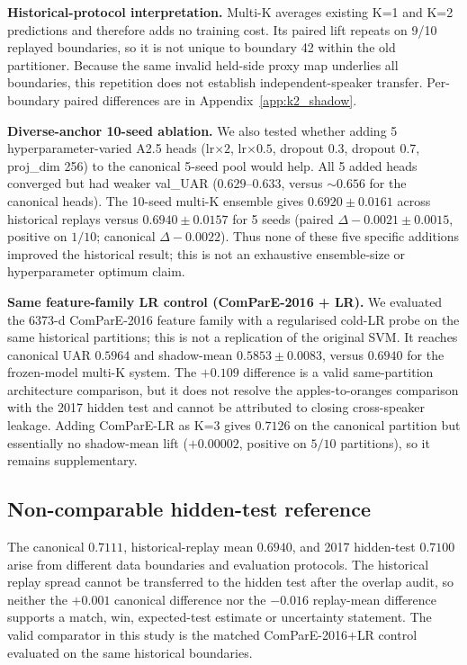 \textbf{Historical-protocol interpretation.} Multi-K averages existing K=1 and K=2 predictions and therefore adds no training cost. Its paired lift repeats on 9/10 replayed boundaries, so it is not unique to boundary 42 within the old partitioner. Because the same invalid held-side proxy map underlies all boundaries, this repetition does not establish independent-speaker transfer. Per-boundary paired differences are in Appendix~\ref{app:k2_shadow}.

\textbf{Diverse-anchor 10-seed ablation.} We also tested whether adding 5 hyperparameter-varied A2.5 heads (lr$\times 2$, lr$\times 0.5$, dropout 0.3, dropout 0.7, proj\_dim 256) to the canonical 5-seed pool would help. All 5 added heads converged but had weaker val\_UAR ($0.629$--$0.633$, versus $\sim 0.656$ for the canonical heads). The 10-seed multi-K ensemble gives $0.6920 \pm 0.0161$ across historical replays versus $0.6940 \pm 0.0157$ for 5 seeds (paired $\Delta -0.0021 \pm 0.0015$, positive on $1/10$; canonical $\Delta -0.0022$). Thus none of these five specific additions improved the historical result; this is not an exhaustive ensemble-size or hyperparameter optimum claim.

\textbf{Same feature-family LR control (ComParE-2016 + LR).} We evaluated the 6373-d ComParE-2016 feature family with a regularised cold-LR probe on the same historical partitions; this is not a replication of the original SVM. It reaches canonical UAR $0.5964$ and shadow-mean $0.5853 \pm 0.0083$, versus $0.6940$ for the frozen-model multi-K system. The $+0.109$ difference is a valid same-partition architecture comparison, but it does not resolve the apples-to-oranges comparison with the 2017 hidden test and cannot be attributed to closing cross-speaker leakage. Adding ComParE-LR as K=3 gives $0.7126$ on the canonical partition but essentially no shadow-mean lift ($+0.00002$, positive on $5/10$ partitions), so it remains supplementary.

\subsection{Non-comparable hidden-test reference}

The canonical $0.7111$, historical-replay mean $0.6940$, and 2017 hidden-test $0.7100$ arise from different data boundaries and evaluation protocols. The historical replay spread cannot be transferred to the hidden test after the overlap audit, so neither the $+0.001$ canonical difference nor the $-0.016$ replay-mean difference supports a match, win, expected-test estimate or uncertainty statement. The valid comparator in this study is the matched ComParE-2016$+$LR control evaluated on the same historical boundaries.

